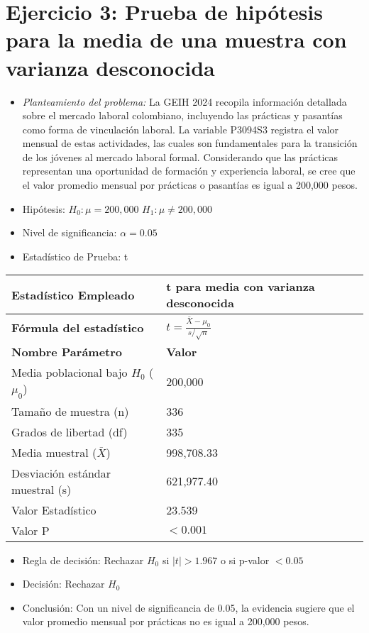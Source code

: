 \documentclass[12pt,a4paper]{article}
\begin{document}
\section*{Ejercicio 3: Prueba de hipótesis para la media de una muestra con varianza desconocida}
\begin{itemize}
    \item \textit{Planteamiento del problema:} La GEIH 2024 recopila información detallada sobre el mercado laboral colombiano, incluyendo las prácticas y pasantías como forma de vinculación laboral. La variable P3094S3 registra el valor mensual de estas actividades, las cuales son fundamentales para la transición de los jóvenes al mercado laboral formal. Considerando que las prácticas representan una oportunidad de formación y experiencia laboral, se cree que el valor promedio mensual por prácticas o pasantías es igual a 200,000 pesos.
    \item Hipótesis: \quad $H_{0}: \mu = 200,000$ \hspace{2cm} $H_{1}: \mu \neq 200,000$
    \item Nivel de significancia: $\alpha = 0.05$
    \item Estadístico de Prueba: t
\end{itemize}

\begin{tabular}{|m{7cm}|m{7cm}|}
\hline
\textbf{Estadístico Empleado} & t para media con varianza desconocida \\ \hline
\textbf{Fórmula del estadístico} & $t = \frac{\bar{X} - \mu_0}{s/\sqrt{n}}$ \\ \hline
\textbf{Nombre Parámetro} & \textbf{Valor} \\ \hline
Media poblacional bajo $H_0$ ($\mu_0$) & 200,000 \\ \hline
Tamaño de muestra (n) & 336 \\ \hline
Grados de libertad (df) & 335 \\ \hline
Media muestral ($\bar{X}$) & 998,708.33 \\ \hline
Desviación estándar muestral (s) & 621,977.40 \\ \hline
Valor Estadístico & 23.539 \\ \hline
Valor P & $< 0.001$ \\ \hline
\end{tabular}

\begin{itemize}
    \item Regla de decisión: Rechazar $H_0$ si $|t| > 1.967$ o si p-valor $< 0.05$
    \item Decisión: Rechazar $H_0$
    \item Conclusión: Con un nivel de significancia de 0.05, la evidencia sugiere que el valor promedio mensual por prácticas no es igual a 200,000 pesos.
\end{itemize}
\end{document}
